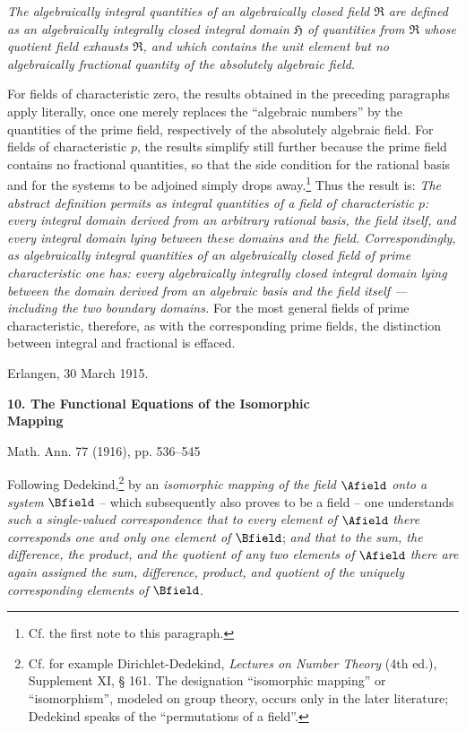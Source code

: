 \documentclass[11pt]{article}
\begin{document}
\emph{The algebraically integral quantities of an algebraically closed field
$\mathfrak R$ are defined as an algebraically integrally closed integral domain
$\mathfrak H$ of quantities from $\mathfrak R$ whose quotient field exhausts
$\mathfrak R$, and which contains the unit element but no algebraically
fractional quantity of the absolutely algebraic field.}

For fields of characteristic zero, the results obtained in the preceding
paragraphs apply literally, once one merely replaces the ``algebraic numbers'' by
the quantities of the prime field, respectively of the absolutely algebraic
field. For fields of characteristic $p$, the results simplify still further
because the prime field contains no fractional quantities, so that the side
condition for the rational basis and for the systems to be adjoined simply drops
away.\footnote{Cf. the first note to this paragraph.} Thus the result is:
\emph{The abstract definition permits as integral quantities of a field of
characteristic $p$: every integral domain derived from an arbitrary rational
basis, the field itself, and every integral domain lying between these domains
and the field. Correspondingly, as algebraically integral quantities of an
algebraically closed field of prime characteristic one has: every algebraically
integrally closed integral domain lying between the domain derived from an
algebraic basis and the field itself --- including the two boundary domains.} For
the most general fields of prime characteristic, therefore, as with the
corresponding prime fields, the distinction between integral and fractional is
effaced.

\medskip
\noindent Erlangen, 30 March 1915.

\clearpage

\begin{center}
{\Large\bfseries 10. The Functional Equations of the Isomorphic\\ Mapping}\par
\vspace{1.25em}
Math. Ann. 77 (1916), pp. 536--545
\end{center}

\vspace{3em}

Following Dedekind,\footnote{Cf. for example Dirichlet-Dedekind, \emph{Lectures on Number Theory} (4th ed.), Supplement XI, § 161. The designation ``isomorphic mapping'' or ``isomorphism'', modeled on group theory, occurs only in the later literature; Dedekind speaks of the ``permutations of a field''.} by an \emph{isomorphic mapping of the field} \(\Afield\) \emph{onto a system} \(\Bfield\) -- which subsequently also proves to be a field -- one understands \emph{such a single-valued correspondence that to every element of} \(\Afield\) \emph{there corresponds one and only one element of} \(\Bfield\); \emph{and that to the sum, the difference, the product, and the quotient of any two elements of} \(\Afield\) \emph{there are again assigned the sum, difference, product, and quotient of the uniquely corresponding elements of} \(\Bfield\).
\end{document}
